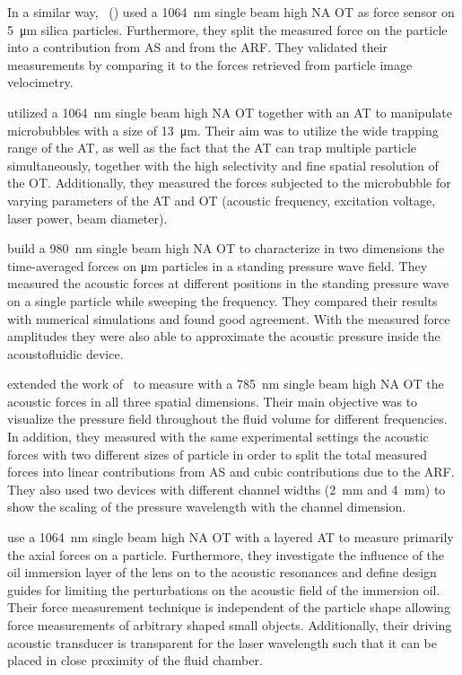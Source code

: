 In a similar way, ~(\citeyear{Bassindale2014}) used a 
\SI{1064}{\nm} single beam high NA OT as force sensor on \SI{5}{\um} silica 
particles.  Furthermore, they split the measured force on the particle into a 
contribution from AS and from the ARF. They validated their measurements by 
comparing it to the forces retrieved from particle image velocimetry.

 utilized a \SI{1064}{\nm} single beam high NA OT together with 
an AT to manipulate microbubbles with a size of \SI{13}{\um}. Their aim was to 
utilize the wide trapping range of the AT, as well as the fact that the AT can 
trap multiple particle simultaneously, together with the high selectivity and 
fine spatial resolution of the OT. Additionally, they measured the forces 
subjected to the microbubble for varying parameters of the AT and OT (acoustic 
frequency, excitation voltage, laser power, beam diameter).

 build a \SI{980}{\nm} single beam high NA OT to 
characterize in two dimensions the time-averaged forces on \si{\um} particles 
in a standing pressure wave field. They measured the acoustic forces at 
different positions in the standing pressure wave on a single particle while 
sweeping the frequency. They compared their results with numerical simulations 
and found good agreement. With the measured force amplitudes they were also 
able to approximate the acoustic pressure inside the acoustofluidic device.

 extended the work of~\cite{Lakaemper2015} to measure with 
a \SI{785}{\nm} single beam high NA OT the acoustic forces in all three spatial 
dimensions. Their main objective was to visualize the pressure field throughout 
the fluid volume for different frequencies. In addition, they measured with the 
same experimental settings the acoustic forces with two different sizes of 
particle in order to split the total measured forces into linear contributions 
from AS and cubic contributions due to the ARF. They also used two devices with 
different channel widths (\SI{2}{\mm} and \SI{4}{\mm}) to show the scaling of 
the pressure wavelength with the channel dimension.

 use a \SI{1064}{\nm} single beam high NA OT with a 
layered AT to measure primarily the axial forces on a particle. Furthermore, 
they investigate the influence of the oil immersion layer of the lens on to the 
acoustic resonances and define design guides for limiting the perturbations on 
the acoustic field of the immersion oil. Their force measurement technique is 
independent of the particle shape allowing force measurements of arbitrary 
shaped small objects. Additionally, their driving acoustic transducer is 
transparent for the laser wavelength such that it can be placed in close 
proximity of the fluid chamber.


